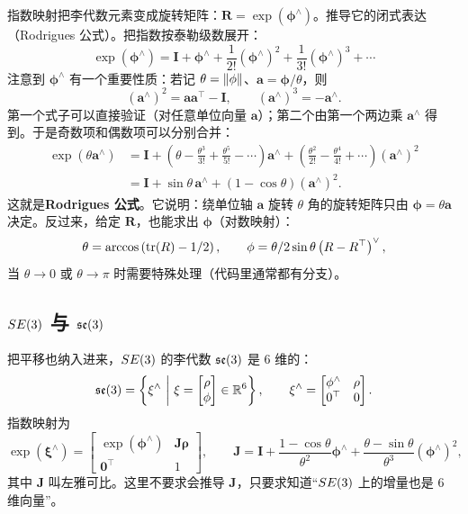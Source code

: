 指数映射把李代数元素变成旋转矩阵：$\bm{R}=\exp(\bm{\phi}^{\wedge})$。推导它的闭式表达（Rodrigues 公式）。把指数按泰勒级数展开：
\begin{equation}
\exp(\bm{\phi}^{\wedge})=\bm{I}+\bm{\phi}^{\wedge}+\frac{1}{2!}(\bm{\phi}^{\wedge})^{2}+\frac{1}{3!}(\bm{\phi}^{\wedge})^{3}+\cdots
\end{equation}
注意到 $\bm{\phi}^{\wedge}$ 有一个重要性质：若记 $\theta=\left\lVert \phi \right\rVert$、$\bm{a}=\bm{\phi}/\theta$，则
\begin{equation}
(\bm{a}^{\wedge})^{2}=\bm{a}\bm{a}^{\top}-\bm{I},\qquad (\bm{a}^{\wedge})^{3}=-\bm{a}^{\wedge}.
\end{equation}
第一个式子可以直接验证（对任意单位向量 $\bm{a}$）；第二个由第一个两边乘 $\bm{a}^{\wedge}$ 得到。于是奇数项和偶数项可以分别合并：
\begin{align}
\exp(\theta\bm{a}^{\wedge})
&=\bm{I}+\left(\theta-\frac{\theta^{3}}{3!}+\frac{\theta^{5}}{5!}-\cdots\right)\bm{a}^{\wedge}
+\left(\frac{\theta^{2}}{2!}-\frac{\theta^{4}}{4!}+\cdots\right)(\bm{a}^{\wedge})^{2}\nonumber\\
&=\bm{I}+\sin\theta\,\bm{a}^{\wedge}+(1-\cos\theta)(\bm{a}^{\wedge})^{2}.
\label{eq:02-rodrigues}
\end{align}
这就是\textbf{Rodrigues 公式}。它说明：绕单位轴 $\bm{a}$ 旋转 $\theta$ 角的旋转矩阵只由 $\bm{\phi}=\theta\bm{a}$ 决定。反过来，给定 $\bm{R}$，也能求出 $\bm{\phi}$（对数映射）：
\begin{equation}
\theta=\arccos\left(\operatorname{tr}(R)-1/2\right),\qquad
\phi=\theta/2\sin\theta\left(R-R^{\top}\right)^{\vee},
\end{equation}
当 $\theta\to0$ 或 $\theta\to\pi$ 时需要特殊处理（代码里通常都有分支）。

\subsection{$SE(3)$ 与 $\mathfrak{se}(3)$}

把平移也纳入进来，$SE(3)$ 的李代数 $\mathfrak{se}(3)$ 是 6 维的：
\begin{equation}
\se(3)=\left\{\bm{\xi}^{\wedge}\ \middle|\ \bm{\xi}=\begin{bmatrix}\bm{\rho}\\ \bm{\phi}\end{bmatrix}\in\R^{6}\right\},\qquad
\bm{\xi}^{\wedge}=\begin{bmatrix}\bm{\phi}^{\wedge}&\bm{\rho}\\\bm{0}^{\top}&0\end{bmatrix}.
\end{equation}
指数映射为
\begin{equation}
\exp(\bm{\xi}^{\wedge})=\begin{bmatrix}\exp(\bm{\phi}^{\wedge})&\bm{J}\bm{\rho}\\\bm{0}^{\top}&1\end{bmatrix},\qquad
\bm{J}=\bm{I}+\frac{1-\cos\theta}{\theta^{2}}\bm{\phi}^{\wedge}+\frac{\theta-\sin\theta}{\theta^{3}}(\bm{\phi}^{\wedge})^{2},
\end{equation}
其中 $\bm{J}$ 叫左雅可比。这里不要求会推导 $\bm{J}$，只要求知道“$SE(3)$ 上的增量也是 6 维向量”。

